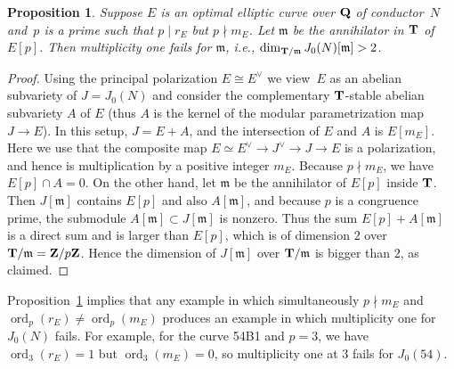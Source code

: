 \documentclass[10pt,twoside]{article}
\newcommand{\edit}[1]{\footnote{EDIT: #1}\marginpar{\hfill {\sf \thefootnote}}}
\newcommand{\Z}{{\bf{Z}}}
\newcommand{\Q}{{\bf{Q}}}
\newcommand{\T}{{\bf{T}}}
\newcommand{\m}{{\mathfrak{m}}}
\newcommand{\isom}{\cong}
\newtheorem{prop}[lem]{Proposition}
\theoremstyle{definition}
\DeclareMathOperator{\ord}{ord}
\begin{document}
\begin{prop}\label{prop:mult1J}
  Suppose $E$ is an optimal elliptic curve over $\Q$ of conductor~$N$
  and~$p$ is a prime such that $p \mid r_E$ but $p\nmid m_E$.  Let
  $\m$ be the annihilator in $\T$ of $E[p]$.  Then multiplicity one
  fails for $\m$, i.e., $\dim_{\T/\m} J_0(N)[\m] > 2$.
\end{prop}
\begin{proof}
  Using the principal polarization $E \isom E^{\vee}$ we view~$E$ as
  an abelian subvariety of $J=J_0(N)$ and consider the complementary
  $\T$-stable abelian subvariety $A$ of $E$ (thus $A$ is the kernel of
  the modular parametrization map $J\to E$).  In this setup, $J = E +
  A$, and the intersection of $E$ and $A$ is $E[m_E]$.  Here we use
  that the composite map
  $
    E \simeq E^{\vee} \to J^{\vee} \to J \to E
  $
  is a polarization, and hence is multiplication by a positive integer
  $m_E$.  Because $p\nmid m_E$, we have $E[p]\cap A = 0$.  On the
  other hand, let $\m$ be the annihilator of $E[p]$ inside $\T$.  Then
  $J[\m]$ contains $E[p]$ and also $A[\m]$, and because $p$ is a
  congruence prime, the submodule $A[\m]\subset J[\m]$ is nonzero.
  Thus the sum $E[p] + A[\m]$ is a direct sum and is larger than
  $E[p]$, which is of dimension $2$ over $\T/\m = \Z/p\Z$.  Hence the
  dimension of $J[\m]$ over $\T/\m$ is bigger than $2$, as claimed.
\end{proof}

Proposition~\ref{prop:mult1J} implies that any example in which
simultaneously $p\nmid m_E$ and $\ord_p(r_E)\neq \ord_p(m_E)$ produces
an example in which multiplicity one for $J_0(N)$ fails.  For example,
for the curve 54B1 and $p=3$, we have $\ord_3(r_E)=1$ but
$\ord_3(m_E)=0$, so multiplicity one at $3$ fails for $J_0(54)$.
\end{document}
